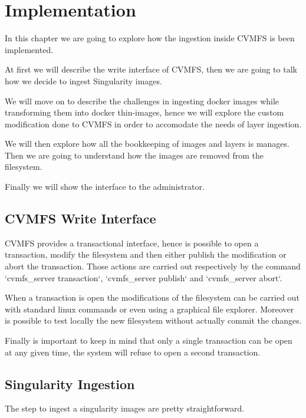 \chapter{Implementation}\label{ch:Implementation}

In this chapter we are going to explore how the ingestion inside CVMFS is been
implemented.

At first we will describe the write interface of CVMFS, then we are going to
talk how we decide to ingest Singularity images.

We will move on to describe the challenges in ingesting docker images while
transforming them into docker thin-images, hence we will explore the custom
modification done to CVMFS in order to accomodate the needs of layer ingestion.

We will then explore how all the bookkeeping of images and layers is manages.
Then we are going to understand how the images are removed from the filesystem.

Finally we will show the interface to the administrator.

\section{CVMFS Write Interface}

CVMFS provides a transactional interface, hence is possible to open a
transaction, modify the filesystem and then either publish the modification or
abort the transaction. Those actions are carried out respectively by the
command `cvmfs\_server transaction`, `cvmfs\_server publish` and `cvmfs\_server
abort`.

When a transaction is open the modifications of the filesystem can be carried
out with standard linux commands or even using a graphical file explorer.
Moreover is possible to test locally the new filesystem without actually commit
the changes.

Finally is important to keep in mind that only a single transaction can be open
at any given time, the system will refuse to open a second transaction. 

\section{Singularity Ingestion}

The step to ingest a singularity images are pretty straightforward.

